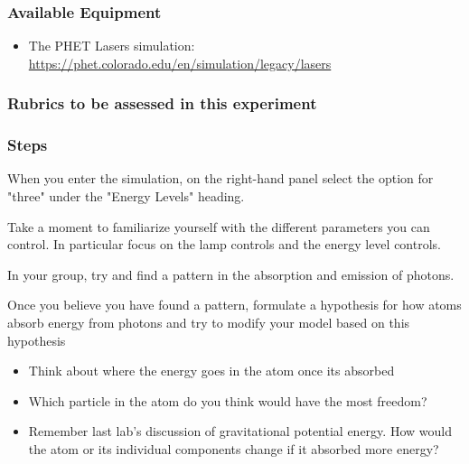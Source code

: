 \subsubsection{Available Equipment}

\begin{itemize}
	\item The PHET Lasers simulation: \url{https://phet.colorado.edu/en/simulation/legacy/lasers}
\end{itemize} 

\subsubsection{Rubrics to be assessed in this experiment}

\subsubsection{Steps}

\begin{steps}
	\item When you enter the simulation, on the right-hand panel select the option for "three" under the "Energy Levels" heading.
	
	\item Take a moment to familiarize yourself with the different parameters you can control. In particular focus on the lamp controls and the energy level controls. 
	
	\item In your group, try and find a pattern in the absorption and emission of photons.
	
	\item Once you believe you have found a pattern, formulate a hypothesis for how atoms absorb energy from photons and try to modify your model based on this hypothesis
	\begin{itemize}
		\item Think about where the energy goes in the atom once its absorbed
		
		\item Which particle in the atom do you think would have the most freedom?
		
		\item Remember last lab's discussion of gravitational potential energy. How would the atom or its individual components change if it absorbed more energy? 
	\end{itemize}
\end{steps}

